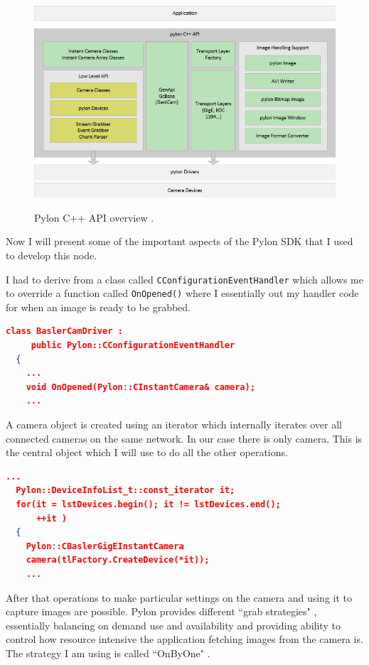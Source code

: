 \documentclass[a4paper, 12pt, oneside]{report}
\begin{document}
  \begin{figure}[h]
      \caption{Pylon C++ API overview \protect\cite{pylonOpenSource-2020-02-14}.}
      \centering
      \includegraphics[width=1\textwidth]{pylon3_0_cpp_api}
      \label{fig:pylon_arch}
  \end{figure}

  \noindent Now I will present some of the important aspects of the Pylon SDK that I used to develop this node.
  
  \noindent I had to derive from a class called \texttt{CConfigurationEventHandler} which allows me to override a function called \texttt{OnOpened()} where I essentially out my handler code for when an image is ready to be grabbed. 
  
  \begin{lstlisting}[language=json,firstnumber=1]
  class BaslerCamDriver : 
     public Pylon::CConfigurationEventHandler
  {
    ...
    void OnOpened(Pylon::CInstantCamera& camera);
    ...
  \end{lstlisting}

  \noindent A camera object is created using an iterator which internally iterates over all connected cameras on the same network. In our case there is only camera. This is the central object which I will use to do all the other operations. 

  \begin{lstlisting}[language=json,firstnumber=1]
  ...
  Pylon::DeviceInfoList_t::const_iterator it;
  for(it = lstDevices.begin(); it != lstDevices.end(); 
      ++it )
  {
    Pylon::CBaslerGigEInstantCamera 
    camera(tlFactory.CreateDevice(*it));
    ...
  \end{lstlisting}
  
  After that operations to make particular settings on the camera and using it to capture images are possible. Pylon provides different ``grab strategies" \cite{pylonOpenSource-2020-02-14}, essentially balancing on demand use and availability and providing ability to control how resource intensive the application fetching images from the camera is. The strategy I am using is called ``OnByOne" \cite{pylonOpenSource-2020-02-14}.
  
\end{document}
